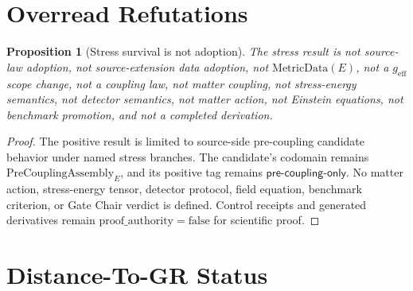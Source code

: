 \documentclass[11pt]{article}
\newcommand{\MetricData}{\mathrm{MetricData}}
\newcommand{\geff}{g_{\mathrm{eff}}}
\newcommand{\PreCoupAsm}{\mathrm{PreCouplingAssembly}}
\newcommand{\ProofAuthFalse}{\mathrm{proof\_authority=false}}
\newtheorem{proposition}{Proposition}
\begin{document}
\section{Overread Refutations}

\begin{proposition}[Stress survival is not adoption]
The stress result is not source-law adoption, not source-extension data
adoption, not \(\MetricData(E)\), not a \(\geff\) scope change, not a
coupling law, not matter coupling, not stress-energy semantics, not detector
semantics, not matter action, not Einstein equations, not benchmark
promotion, and not a completed derivation.
\end{proposition}

\begin{proof}
The positive result is limited to source-side pre-coupling candidate behavior
under named stress branches. The candidate's codomain remains
\(\PreCoupAsm_E\), and its positive tag remains
\(\mathsf{pre\text{-}coupling\text{-}only}\). No matter action,
stress-energy tensor, detector protocol, field equation, benchmark criterion,
or Gate Chair verdict is defined. Control receipts and generated derivatives
remain \(\ProofAuthFalse\) for scientific proof.
\end{proof}

\section{Distance-To-GR Status}
\end{document}
